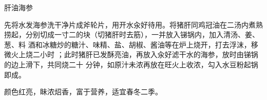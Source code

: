 \begin{recipe}{肝油海参}

\ingredients


\preparation

\step 先将水发海参洗干净片成斧轮片，用开水汆好待用。将猪肝同鸡冠油在二汤内煮熟
捞起，分别切成一寸二的块（切猪肝时去筋），一并放入锑锅内，加入清汤、姜、葱、料
酒和冰糖炒的糖汁、味精、盐、胡椒、酱油等在炉上烧开，打去浮沫，移微火上烧二小时
；此时猪肝已发酥亮油，再放入汆好滤干水的海参，放时由锑锅的边上滑下，共同烧二十
分钟，如原汁未浓再放在旺火上收浓，勾入水豆粉起锅即成。

\features

颜色红亮，眛浓炤香，富于营养，适宜春冬二季。

\end{recipe}

